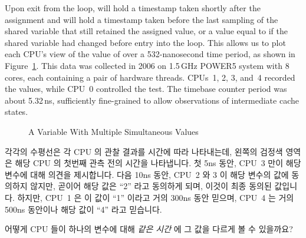 Upon exit from the loop,  will hold a timestamp
taken shortly after the assignment and  will hold
a timestamp taken before the last sampling of the shared variable
that still retained the assigned value, or a value equal to 
if the shared variable had changed before entry into the loop.
This allows us to plot each CPU's view of the value of 
over a 532-nanosecond time period, as shown in
Figure~\ref{fig:advsync:A Variable With Multiple Simultaneous Values}.
This data was collected in 2006 on 1.5\,GHz POWER5 system with 8 cores,
each containing a pair of hardware threads.
CPUs~1, 2, 3, and~4 recorded the values, while CPU~0 controlled the test.
The timebase counter period was about 5.32\,ns, sufficiently fine-grained
to allow observations of intermediate cache states.
\fi

\begin{figure}[htb]
\centering
{}
\caption{A Variable With Multiple Simultaneous Values}
\label{fig:advsync:A Variable With Multiple Simultaneous Values}
\end{figure}

각각의 수평선은 각 CPU 의 관찰 결과를 시간에 따라 나타내는데, 왼쪽의 검정색
영역은 해당 CPU 의 첫번째 관측 전의 시간을 나타냅니다.
첫 5ns 동안, CPU~3 만이 해당 변수에 대해 의견을 제시합니다.
다음 10ns 동안, CPU~2 와 3 이 해당 변수의 값에 동의하지 않지만, 곧이어 해당
값은 ``2'' 라고 동의하게 되며, 이것이 최종 동의된 값입니다.
하지만, CPU~1 은 이 값이 ``1'' 이라고 거의 300ns 동안 믿으며, CPU~4 는 거의
500ns 동안이나 해당 값이 ``4'' 라고 믿습니다.

\QuickQuiz{}
	어떻게 CPU 들이 하나의 변수에 대해 \emph{같은 시간} 에 그 값을 다르게
	볼 수 있을까요?
	\iffalse


